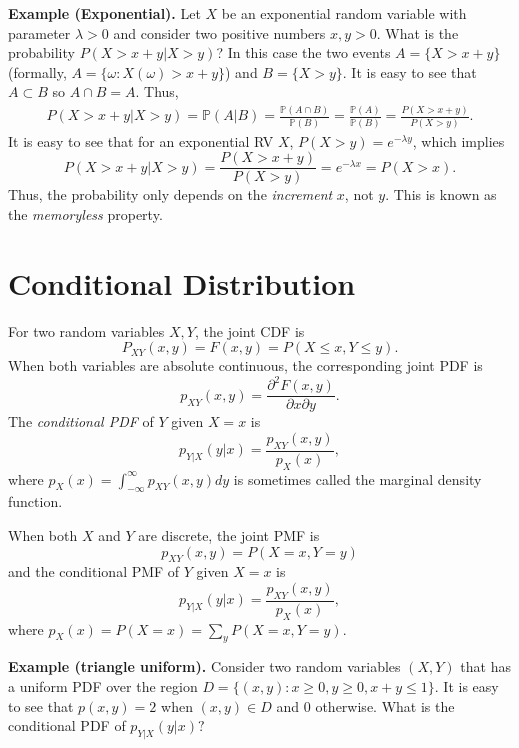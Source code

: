 \documentclass[twoside]{article}
\begin{document}
{\bf Example (Exponential).}
Let $X$ be an exponential random variable with parameter $\lambda>0$
and consider two positive numbers $x,y>0$.
What is the probability $P(X>x+y|X>y)$?
In this case the two events $A = \{X>x+y\}$ (formally, $A = \{\omega: X(\omega)>x+y\}$)
and $B = \{X>y\}$. 
It is easy to see that $A\subset B$ so $A\cap B = A$.
Thus, 
\begin{align*}
P(X>x+y|X>y)  = 
\mathbb{P}(A|B) 
= \frac{\mathbb{P}(A\cap B)}{\mathbb{P}(B)}
= \frac{\mathbb{P}(A)}{\mathbb{P}(B)} = \frac{P(X>x+y)}{P(X>y)}.
\end{align*}
It is easy to see that for an exponential RV $X$, $P(X>y) = e^{-\lambda y}$,
which implies 
$$
P(X>x+y|X>y) = \frac{P(X>x+y)}{P(X>y)} = e^{-\lambda x} = P(X>x).
$$
Thus, the probability only depends on the \emph{increment} $x$, 
not $y$. 
This is known as the \emph{memoryless} property.

\section{Conditional Distribution}

For two random variables $X,Y$, the joint CDF is 
$$
P_{XY}(x,y) = F(x,y) = P(X\leq x, Y\leq y).
$$
When both variables are absolute continuous, 
the corresponding joint PDF is
$$
p_{XY}(x,y) = \frac{\partial^2F(x,y)}{\partial x\partial y}. 
$$
The \emph{conditional PDF} of $Y$ given $X=x$ is
$$
p_{Y|X}(y|x) = \frac{p_{XY}(x,y)}{p_X(x)},
$$
where $p_X(x) = \int_{-\infty}^\infty p_{XY}(x,y)dy$
is sometimes called the marginal density function. 


When both $X$ and $Y$ are discrete,
the joint PMF is 
$$
p_{XY}(x,y) = P(X= x, Y= y)
$$
and the conditional PMF of $Y$ given $X=x$ is
$$
p_{Y|X}(y|x) = \frac{p_{XY}(x,y)}{p_X(x)},
$$
where $p_X(x) = P(X=x) = \sum_{y}P(X=x,Y=y)$.

{\bf Example (triangle uniform).}
Consider  two random variables $(X,Y)$
that has a uniform PDF over the region $D = \{(x,y): x\geq 0, y\geq 0, x+y\leq 1\}$.
It is easy to see that $p(x,y) = 2$ when $(x,y)\in D$ and $0$ otherwise. 
What is the conditional PDF of $p_{Y|X}(y|x)?$\\
\begin{center}
\end{center}
\end{document}
